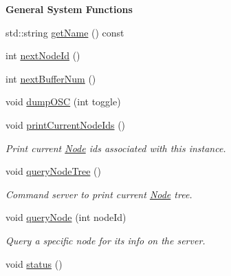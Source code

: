 \begin{Indent}{\bf General System Functions}\par
\begin{DoxyCompactItemize}
\item 
std\-::string \hyperlink{classColliderPlusPlus_1_1Client__Server_a060d9265bec3d3e1b0075dda129f8c58}{get\-Name} () const 
\item 
int \hyperlink{classColliderPlusPlus_1_1Client__Server_ab6d86e231c6b2d2048374f58e9e098f0}{next\-Node\-Id} ()
\item 
int \hyperlink{classColliderPlusPlus_1_1Client__Server_abeae0099b97a92796521fab73eb89d14}{next\-Buffer\-Num} ()
\item 
void \hyperlink{classColliderPlusPlus_1_1Client__Server_a263c4fe83950ebafc5877da3eb47bfdd}{dump\-O\-S\-C} (int toggle)
\item 
\hypertarget{classColliderPlusPlus_1_1Client__Server_aab11fcc81b1da847f8beac8cee7b4f63}{void \hyperlink{classColliderPlusPlus_1_1Client__Server_aab11fcc81b1da847f8beac8cee7b4f63}{print\-Current\-Node\-Ids} ()}\label{classColliderPlusPlus_1_1Client__Server_aab11fcc81b1da847f8beac8cee7b4f63}

\begin{DoxyCompactList}\small\item\em Print current \hyperlink{classColliderPlusPlus_1_1Node}{Node} ids associated with this instance. \end{DoxyCompactList}\item 
\hypertarget{classColliderPlusPlus_1_1Client__Server_aa8924710d457d023118ead6f05076335}{void \hyperlink{classColliderPlusPlus_1_1Client__Server_aa8924710d457d023118ead6f05076335}{query\-Node\-Tree} ()}\label{classColliderPlusPlus_1_1Client__Server_aa8924710d457d023118ead6f05076335}

\begin{DoxyCompactList}\small\item\em Command server to print current \hyperlink{classColliderPlusPlus_1_1Node}{Node} tree. \end{DoxyCompactList}\item 
\hypertarget{classColliderPlusPlus_1_1Client__Server_a24847ad20895ba57d1244768c90ddda1}{void \hyperlink{classColliderPlusPlus_1_1Client__Server_a24847ad20895ba57d1244768c90ddda1}{query\-Node} (int node\-Id)}\label{classColliderPlusPlus_1_1Client__Server_a24847ad20895ba57d1244768c90ddda1}

\begin{DoxyCompactList}\small\item\em Query a specific node for its info on the server. \end{DoxyCompactList}\item 
\hypertarget{classColliderPlusPlus_1_1Client__Server_a1a0642fa152a9c1ad5a5ca16f31aa6e1}{void \hyperlink{classColliderPlusPlus_1_1Client__Server_a1a0642fa152a9c1ad5a5ca16f31aa6e1}{status} ()}\label{classColliderPlusPlus_1_1Client__Server_a1a0642fa152a9c1ad5a5ca16f31aa6e1}


\end{DoxyCompactItemize}
\end{Indent}
